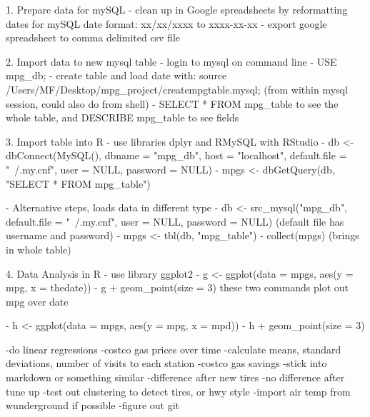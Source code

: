 1. Prepare data for mySQL
   - clean up in Google spreadsheets by reformatting dates for mySQL date format: xx/xx/xxxx to xxxx-xx-xx
   - export google spreadsheet to comma delimited csv file

2. Import data to new mysql table
   - login to mysql on command line
   - USE mpg_db;
   - create table and load date with: source /Users/MF/Desktop/mpg_project/creatempgtable.mysql; (from within mysql session, could also do from shell)
   - SELECT * FROM mpg_table to see the whole table, and DESCRIBE mpg_table to see fields
 
3. Import table into R
   - use libraries dplyr and RMySQL with RStudio
   -  db <- dbConnect(MySQL(), dbname = "mpg_db", host = "localhost", default.file = "~/.my.cnf", user = NULL, password = NULL)
   - mpgs <- dbGetQuery(db, "SELECT * FROM mpg_table")
   
   - Alternative steps, loads data in different type
   - db <- src_mysql("mpg_db", default.file = "~/.my.cnf", user = NULL, password = NULL)   (default file has username and password)
   - mpgs <- tbl(db, "mpg_table")
   - collect(mpgs) (brings in whole table)
   
 4. Data Analysis in R
    - use library ggplot2
    - g <- ggplot(data = mpgs, aes(y = mpg, x = thedate))
    - g + geom_point(size = 3) these two commands plot out mpg over date
    
    - h <- ggplot(data = mpgs, aes(y = mpg, x = mpd))
    - h + geom_point(size = 3)
    
    
    -do linear regressions
    -costco gas prices over time
    -calculate means, standard deviations, number of visits to each station
    -costco gas savings
    -stick into markdown or something similar
    -difference after new tires
    -no difference after tune up
    -test out clustering to detect tires, or hwy style
    -import air temp from wunderground if possible
    -figure out git
    
    
    
    
    
